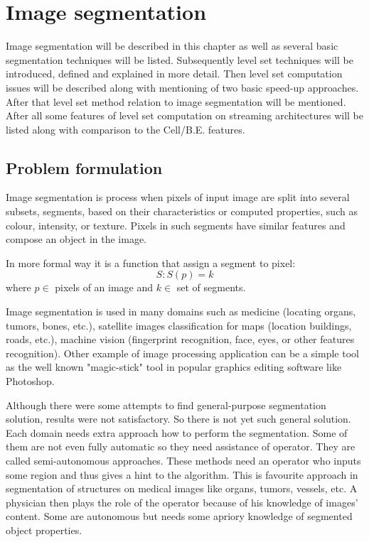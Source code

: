 \chapter{Image segmentation}

Image segmentation will be described in this chapter as well as several basic segmentation techniques will be listed.
Subsequently level set techniques will be introduced, defined and explained in more detail.
Then level set computation issues will be described along with mentioning of two basic speed-up approaches.
After that level set method relation to image segmentation will be mentioned.
After all some features of level set computation on streaming architectures will be listed along with comparison to the \mbox{Cell/B.E.} features.

\section{Problem formulation}
Image segmentation is process when pixels of input image are split into several subsets, segments, based on their characteristics or computed properties, such as colour, intensity, or texture.
Pixels in such segments have similar features and compose an object in the image.

In more formal way it is a function that assign a segment to pixel:
\begin{equation}
S: S(p) = k
\end{equation}
where $p \in$ pixels of an image and $k \in$ set of segments.

Image segmentation is used in many domains such as medicine (locating organs, tumors, bones, etc.), satellite images classification for maps (location buildings, roads, etc.), machine vision (fingerprint recognition, face, eyes, or other features recognition).
Other example of image processing application can be a simple tool as the well known "magic-stick" tool in popular graphics editing software like Photoshop.

Although there were some attempts to find general-purpose segmentation solution, results were not satisfactory.
So there is not yet such general solution.
Each domain needs extra approach how to perform the segmentation.
Some of them are not even fully automatic so they need assistance of operator.
They are called semi-autonomous approaches.
These methods need an operator who inputs some region and thus gives a hint to the algorithm.
This is favourite approach in segmentation of structures on medical images like organs, tumors, vessels, etc.
A physician then plays the role of the operator because of his knowledge of images' content.
Some are autonomous but needs some apriory knowledge of segmented object properties.

